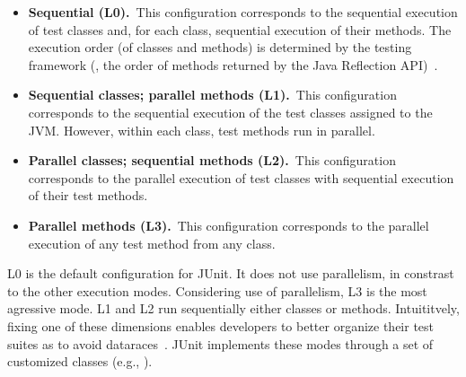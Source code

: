 \newcommand{\Seq}{L0}
\newcommand{\ParClassSeqMeth}{L1}
\newcommand{\SeqClassParMeth}{L2}
\newcommand{\ParClassParMeth}{L3}

\begin{itemize}
\item
    \textbf{Sequential (\Seq).}~This configuration corresponds to the
    sequential execution of test classes and, for each class,
    sequential execution of their methods.  The execution order (of
    classes and methods) is determined by the testing framework (\eg,
    the order of methods returned by the Java Reflection
    API)~\cite{junit-test-order}.
\item
    \textbf{Sequential classes; parallel methods
      (\ParClassSeqMeth{}).}~This configuration corresponds to the
    sequential execution of the test classes assigned to the JVM.
    However, within each class, test methods run in parallel.
\item
    \textbf{Parallel classes; sequential methods
      (\SeqClassParMeth{}).}~This configuration corresponds to the
    parallel execution of test classes with sequential execution of
    their test methods.
\item
    \textbf{Parallel methods (\ParClassParMeth).}~This configuration
    corresponds to the parallel execution of any test method from any
    class.
\end{itemize}

\Seq{} is the default configuration for JUnit.  It does not use
parallelism, in constrast to the other execution modes.  Considering
use of parallelism, \ParClassParMeth{} is the most agressive mode.
\ParClassSeqMeth{} and \SeqClassParMeth{} run sequentially either
classes or methods.  Intuititvely, fixing one of these dimensions
enables developers to better organize their test suites as to avoid
dataraces~.  JUnit implements these modes through a set of
customized classes (e.g., ).



